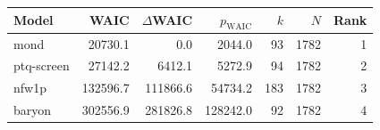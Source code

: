 \begin{tabular}{lrrrrrr}
\toprule
Model & WAIC & $\Delta$WAIC & $p_{\mathrm{WAIC}}$ & $k$ & $N$ & Rank \\
\midrule
mond & 20730.1 & 0.0 & 2044.0 & 93 & 1782 & 1 \\
ptq-screen & 27142.2 & 6412.1 & 5272.9 & 94 & 1782 & 2 \\
nfw1p & 132596.7 & 111866.6 & 54734.2 & 183 & 1782 & 3 \\
baryon & 302556.9 & 281826.8 & 128242.0 & 92 & 1782 & 4 \\
\bottomrule
\end{tabular}
